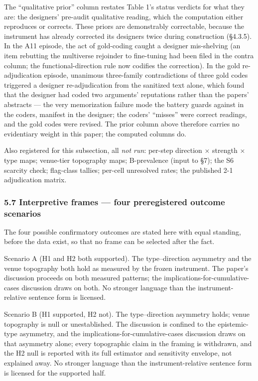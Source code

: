 The ``qualitative prior'' column restates Table 1's status verdicts for what they are: the designers' pre-audit qualitative reading, which the computation either reproduces or corrects. These priors are demonstrably correctable, because the instrument has already corrected its designers twice during construction (\S{}4.3.5). In the A11 episode, the act of gold-coding caught a designer mis-shelving (an item rebutting the multiverse rejoinder to fine-tuning had been filed in the contra column; the functional-direction rule now codifies the correction). In the gold re-adjudication episode, unanimous three-family contradictions of three gold codes triggered a designer re-adjudication from the sanitized text alone, which found that the designer had coded two arguments' reputations rather than the papers' abstracts --- the very memorization failure mode the battery guards against in the coders, manifest in the designer; the coders' ``misses'' were correct readings, and the gold codes were revised. The prior column above therefore carries no evidentiary weight in this paper; the computed columns do.

Also registered for this subsection, all \emph{not run}: per-step direction $\times$ strength $\times$ type maps; venue-tier topography maps; B-prevalence (input to \S{}7); the S6 scarcity check; flag-class tallies; per-cell unresolved rates; the published 2-1 adjudication matrix.

\subsubsection{5.7 Interpretive frames --- four preregistered outcome scenarios}\label{interpretive-frames-four-preregistered-outcome-scenarios}

The four possible confirmatory outcomes are stated here with equal standing, before the data exist, so that no frame can be selected after the fact.

Scenario A (H1 and H2 both supported). The type--direction asymmetry and the venue topography both hold as measured by the frozen instrument. The paper's discussion proceeds on both measured patterns; the implications-for-cumulative-cases discussion draws on both. No stronger language than the instrument-relative sentence form is licensed.

Scenario B (H1 supported, H2 not). The type--direction asymmetry holds; venue topography is null or unestablished. The discussion is confined to the epistemic-type asymmetry, and the implications-for-cumulative-cases discussion draws on that asymmetry alone; every topographic claim in the framing is withdrawn, and the H2 null is reported with its full estimator and sensitivity envelope, not explained away. No stronger language than the instrument-relative sentence form is licensed for the supported half.

